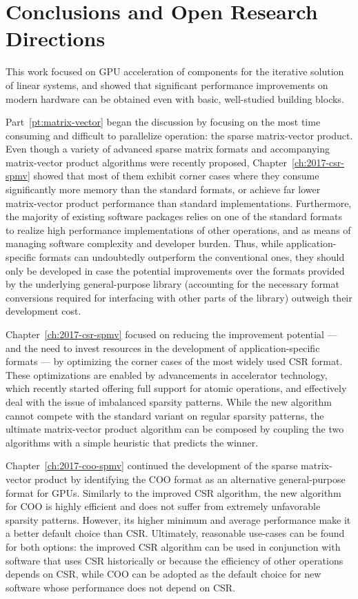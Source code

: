 \section{Conclusions and Open Research Directions}

This work focused on GPU acceleration of components for the iterative solution
of linear systems, and showed that significant performance improvements on
modern hardware can be obtained even with basic, well-studied building
blocks.

Part~\ref{pt:matrix-vector} began the discussion by focusing on the most time
consuming and difficult to parallelize operation: the sparse matrix-vector
product. Even though a variety of advanced sparse matrix formats and
accompanying matrix-vector product algorithms were recently proposed,
Chapter~\ref{ch:2017-csr-spmv} showed that most of them exhibit corner cases
where they consume significantly more memory than the standard formats, or
achieve far lower matrix-vector product performance than standard
implementations. Furthermore, the majority of existing software packages relies
on one of the standard formats to realize high performance implementations of
other operations, and as means of managing software complexity and developer
burden. Thus, while application-specific formats can undoubtedly outperform the
conventional ones, they should only be developed in case the potential
improvements over the formats provided by the underlying general-purpose library
(accounting for the necessary format conversions required for interfacing with
other parts of the library) outweigh their development cost.

Chapter~\ref{ch:2017-csr-spmv} focused on reducing the improvement potential ---
and the need to invest resources in the development of application-specific
formats --- by optimizing the corner cases of the most widely used CSR format.
These optimizations are enabled by advancements in accelerator technology, which
recently started offering full support for atomic operations, and effectively
deal with the issue of imbalanced sparsity patterns.  While the new algorithm
cannot compete with the standard variant on regular sparsity patterns, the
ultimate matrix-vector product algorithm can be composed by coupling the two
algorithms with a simple heuristic that predicts the winner.

Chapter~\ref{ch:2017-coo-spmv} continued the development of the sparse
matrix-vector product by identifying the COO format as an alternative
general-purpose format for GPUs. Similarly to the improved CSR algorithm, the
new algorithm for COO is highly efficient and does not suffer from extremely
unfavorable sparsity patterns. However, its higher minimum and average
performance make it a better default choice than CSR. Ultimately, reasonable
use-cases can be found for both options: the improved CSR algorithm can be used
in conjunction with software that uses CSR historically or because the
efficiency of other operations depends on CSR, while COO can be adopted as the
default choice for new software whose performance does not depend on CSR.

